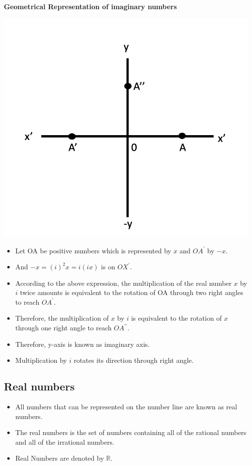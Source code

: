 \documentclass[]{book}
\providecommand{\tightlist}{%
  \setlength{\itemsep}{0pt}\setlength{\parskip}{0pt}}
\begin{document}
\textbf{Geometrical Representation of imaginary numbers}

\begin{center}\includegraphics[width=0.5\linewidth]{figure/1-ImgNum} \end{center}

\begin{itemize}
\tightlist
\item
  Let OA be positive numbers which is represented by \(x\) and \(OA^\prime\) by \(-x\).
\item
  And \(-x= (i)^2x=i(ix)\) is on \(OX^{\prime}\).
\item
  According to the above expression, the multiplication of the real number \(x\) by \(i\) twice amounts is equivalent to the rotation of OA through two right angles to reach \(OA^\prime\).
\item
  Therefore, the multiplication of \(x\) by \(i\) is equivalent to the rotation of \(x\) through one right angle to reach \(OA^{\prime\prime}\).
\item
  Therefore, y-axis is known as imaginary axis.
\item
  Multiplication by \(i\) rotates its direction through right angle.
\end{itemize}

\hypertarget{real-numbers}{%
\subsection{Real numbers}\label{real-numbers}}

\begin{itemize}
\tightlist
\item
  All numbers that can be represented on the number line are known as real numbers.
\item
  The real numbers is the set of numbers containing all of the rational numbers and all of the irrational numbers.
\item
  Real Numbers are denoted by \(\mathbb{R}\).
\end{itemize}
\end{document}

